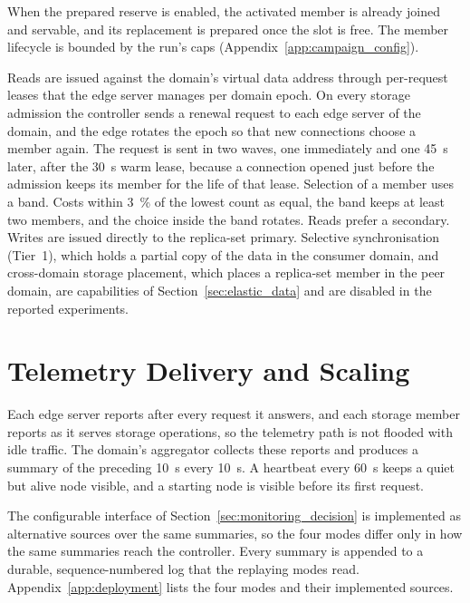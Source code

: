 ﻿\documentclass[12pt,reqno,twoside]{amsbook}
\begin{document}
When the prepared reserve is enabled, the activated member is already
joined and servable, and its replacement is prepared once the slot is
free. The member lifecycle is bounded by the run's caps
(Appendix~\ref{app:campaign_config}).

Reads are issued against the domain's virtual data address through
per-request leases that the edge server manages per domain epoch. On every
storage admission the controller sends a renewal request to each edge
server of the domain, and the edge rotates the epoch so that new
connections choose a member again. The request is sent in two waves, one
immediately and one 45~s later, after the 30~s warm lease, because a
connection opened just before the admission keeps its member for the life
of that lease. Selection of a member uses a band. Costs within 3~\% of the
lowest count as equal, the band keeps at least two members, and the choice
inside the band rotates. Reads prefer a secondary.
Writes are issued directly to the replica-set primary. Selective
synchronisation (Tier~1), which holds a
partial copy of the data in the consumer domain, and cross-domain
storage placement, which places a replica-set member in the peer
domain, are capabilities of Section~\ref{sec:elastic_data} and are
disabled in the reported experiments.

\section{Telemetry Delivery and Scaling}\label{sec:impl_monitoring}

Each edge server reports after every request it answers, and each storage
member reports as it serves storage operations, so the telemetry path is
not flooded with idle traffic. The domain's aggregator collects these reports
and produces a summary of the preceding 10~s every 10~s. A heartbeat every
60~s keeps a quiet but alive node visible, and a starting node is visible
before its first request.

    The configurable interface of Section~\ref{sec:monitoring_decision} is
implemented as alternative sources over the same summaries, so the four
modes differ only in how the same summaries reach the controller. Every
summary is appended to a durable, sequence-numbered log that the replaying
modes read. Appendix~\ref{app:deployment} lists the four modes and their
implemented sources.
\end{document}
